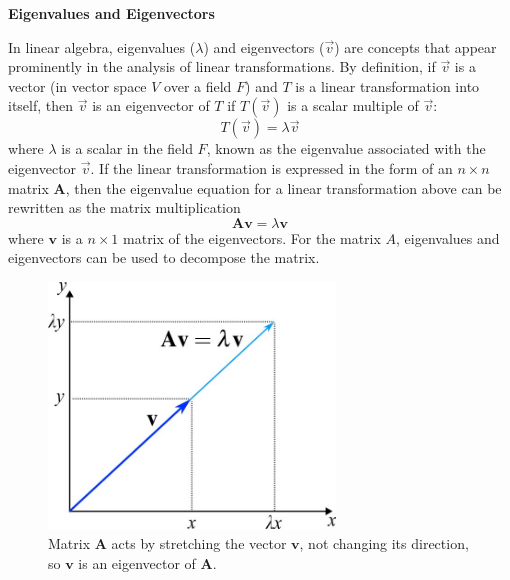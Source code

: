 \documentclass[12pt,letter]{article}
\begin{document}
	

	

	

	\begin{review}
	
		\textbf{Eigenvalues and Eigenvectors}
	
		\noindent In linear algebra, eigenvalues ($\lambda$) and eigenvectors ($\vec{v}$) are concepts that appear prominently in the analysis of linear transformations. By definition, if  $\vec{v}$ is a vector (in vector space $V$ over a field $F$) and $T$ is a linear transformation into itself, then $\vec{v}$ is an eigenvector of $T$ if $T(\vec{v})$ is a scalar multiple of $\vec{v}$:
		\begin{equation}
		T(\vec{v}) = \lambda\vec{v}
		\end{equation}
		where $\lambda$ is a scalar in the field $F$, known as the eigenvalue associated with the eigenvector $\vec{v}$. If the linear transformation is expressed in the form of an $n \times n$ matrix $\textbf{A}$, then the eigenvalue equation for a linear transformation above can be rewritten as the matrix multiplication
		\begin{equation}
		\textbf{A}\textbf{v} = \lambda\textbf{v}
		\end{equation}
		where $\textbf{v}$ is a $n \times 1$ matrix of the eigenvectors. For the matrix $A$, eigenvalues and eigenvectors can be used to decompose the matrix.

		\begin{figure}[H]
			\centering
			\includegraphics[width=3in]{../figures/eigenvalues_2}
			\caption{Matrix $\textbf{A}$ acts by stretching the vector $\textbf{v}$, not changing its direction, so $\textbf{v}$ is an eigenvector of $\textbf{A}$.}
			\label{fig:eigenvalues}
		\end{figure}
		
			
	

\end{review}
\end{document}

